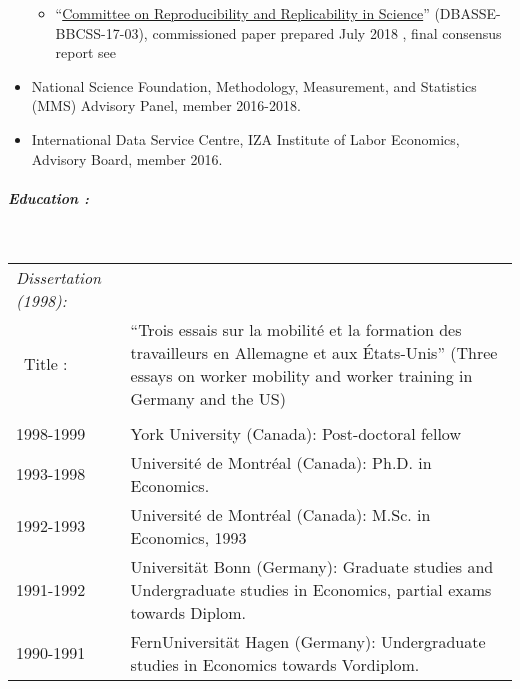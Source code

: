 \documentclass[10pt,letterpaper]{report}
\begin{document}
\begin{itemize}
\begin{itemize}
	\item ``\href{https://www8.nationalacademies.org/pa/projectview.aspx?key=49906}{Committee on Reproducibility and Replicability in Science}'' (DBASSE-BBCSS-17-03), commissioned paper prepared July 2018 \parencite{vilhuber2018nap}, final consensus report see \cite{NAP25303}
\end{itemize}
\item National Science Foundation, Methodology, Measurement, and Statistics (MMS) Advisory Panel, member 2016-2018.
\item International Data Service Centre, IZA Institute of Labor Economics, Advisory Board, member 2016.
\end{itemize}

  
\paragraph{\it \bf Education :}
\ \\
\begin{tabular}{lp{4in}}
\it Dissertation (1998): \\
\ Title :&``Trois essais sur la mobilit\'e et la formation des travailleurs en Allemagne et aux
\'Etats-Unis'' (Three essays on worker mobility and worker training in
Germany and the US)\\
\\
1998-1999   &    York University (Canada): Post-doctoral fellow \\
1993-1998   &    Universit\'e de Montr\'eal (Canada): Ph.D. in Economics. \\
1992-1993   &    Universit\'e de Montr\'eal (Canada): M.Sc. in Economics, 1993 \\
1991-1992   &    Universit\"at Bonn (Germany): Graduate studies and Undergraduate studies in Economics, partial exams towards Diplom.     \\
1990-1991   &    FernUniversit\"at Hagen (Germany): Undergraduate studies in Economics towards Vordiplom. \\
\end{tabular}
\end{document}
